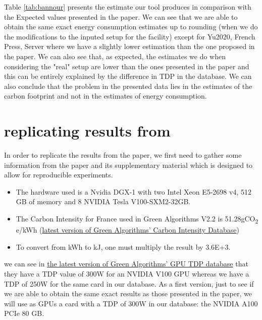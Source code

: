 \documentclass[11pt]{article}
\begin{document}
Table \ref{tab:bannour} presents the estimate our tool produces in
comparison with the Expected values presented in the paper. We can see that we are able to obtain the same exact energy consumption
estimates up to rounding (when we do the modifications to the inputed setup for the
facility) except for Yu2020, French Press, Server where we have a
slightly lower estimation than the one proposed in the paper.
We can also see that, as expected, the estimates we do when
considering the "real" setup are lower than the ones presented in the
paper and this can be entirely explained by the difference in \gls{TDP} in
the database.
We can also conclude that the problem in the presented data lies in
the estimates of the carbon footprint and not in the estimates of
energy consumption.


\section{replicating results from \cite{Jay2023experimental}}
\label{sec:org81b2ca4}
\label{sec:jay}
In order to replicate the results from the paper, we first need to
gather some information from the paper and its supplementary material
which is designed to allow for reproducible experiments.

\begin{itemize}
\item The hardware used is a Nvidia DGX-1 with two Intel Xeon E5-2698 v4, 512 GB of memory and 8 NVIDIA Tesla V100-SXM2-32GB.
\item The Carbon Intensity for France used in Green Algorithms V2.2 is
51.28gCO\textsubscript{2} e/kWh (\href{https://github.com/GreenAlgorithms/green-algorithms-tool/blob/master/data/latest/CI\_aggregated.csv}{latest version of Green Algorithms' Carbon
Intensity Database})
\item To convert from kWh to kJ, one must multiply the result by 3.6E+3.
\end{itemize}

we can see in \href{https://github.com/GreenAlgorithms/green-algorithms-tool/blob/master/data/latest/TDP\_gpu.csv}{the latest version of Green Algorithms' GPU TDP database}
that they have a \gls{TDP} value of 300W for an NVIDIA V100 GPU whereas we
have a \gls{TDP} of 250W for the same card in our database. As a first
version, just to see if we are able to obtain the same exact results
as those presented in the paper, we will use as GPUs a card with a \gls{TDP}
of 300W in our database: the NVIDIA A100 PCIe 80 GB.
\end{document}
